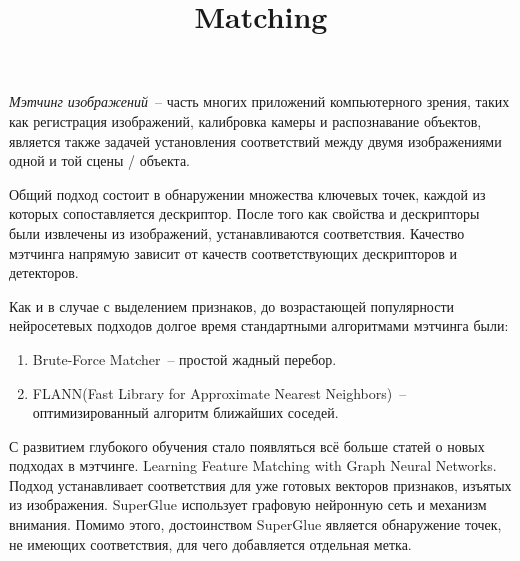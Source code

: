 \documentclass[a4paper]{article}
\begin{document}





\title{Matching} 
\maketitle

\norec{}

\textit{Мэтчинг изображений}~-- часть многих приложений компьютерного зрения, таких как регистрация изображений, калибровка камеры и распознавание объектов, является также задачей установления соответствий между двумя изображениями одной и той сцены / объекта. 


Общий подход состоит в обнаружении множества ключевых точек, каждой из которых сопоставляется дескриптор. После того как свойства и дескрипторы были извлечены из изображений, устанавливаются соответствия. Качество мэтчинга напрямую зависит от качеств соответствующих дескрипторов и детекторов. 




Как и в случае с выделением признаков, до возрастающей популярности нейросетевых подходов долгое время стандартными алгоритмами мэтчинга были:
\begin{enumerate}
    \item Brute-Force Matcher~-- простой жадный перебор.
    \item FLANN(Fast Library for Approximate Nearest Neighbors)~-- оптимизированный алгоритм ближайших соседей.
\end{enumerate}


 С развитием глубокого обучения стало появляться всё больше статей о новых подходах в мэтчинге.
 Learning Feature Matching with Graph Neural Networks. Подход устанавливает соответствия для уже готовых векторов признаков, изъятых из изображения. SuperGlue использует графовую нейронную сеть и механизм внимания. Помимо этого, достоинством SuperGlue является обнаружение точек, не имеющих соответствия, для чего добавляется отдельная метка.
\end{document}
